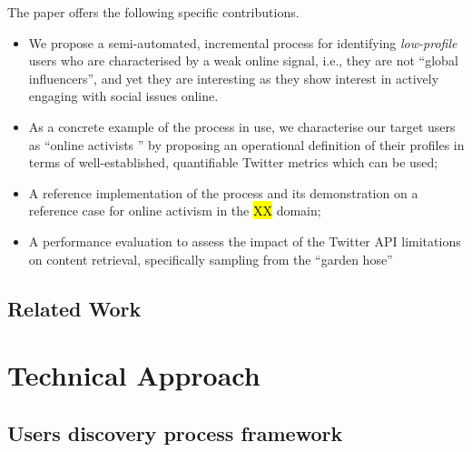 \documentclass[runningheads]{llncs}
\begin{document}
The paper offers the following specific contributions.
\begin{itemize}
\item We propose a semi-automated, incremental process for identifying \textit{low-profile} users who are characterised by a weak online signal, i.e., they are not ``global influencers'', and yet they are interesting as they show interest in actively engaging with social issues online. 

\item As a concrete example of the process in use, we characterise our target users as ``online activists '' by proposing an operational definition of their profiles in terms of well-established, quantifiable Twitter metrics which can be used;

\item A reference implementation of the process and its demonstration on a reference case for online activism in the \hl{XX} domain;

\item A performance evaluation to assess the impact of the Twitter API limitations on content retrieval, specifically sampling from the ``garden hose'' 
\end{itemize}

\subsection{Related Work}



\section{Technical Approach}

\subsection{Users discovery process framework}   \label{sec:discovery}
\end{document}

